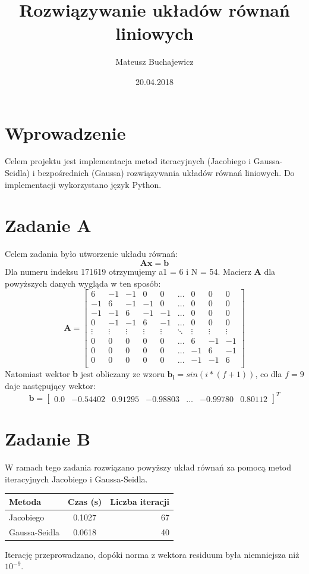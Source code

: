 \documentclass{article} %
\title{Rozwiązywanie układów równań liniowych}
\date{20.04.2018}
\author{Mateusz Buchajewicz}
\begin{document}
\maketitle

\section{Wprowadzenie}
Celem projektu jest implementacja metod iteracyjnych (Jacobiego i Gaussa-Seidla) i
bezpośrednich (Gaussa) rozwiązywania układów równań liniowych. Do implementacji wykorzystano język Python.

\section{Zadanie A}
Celem zadania było utworzenie układu równań:
\begin{equation}
\mathbf{Ax} = \mathbf{b}
\end{equation} 
Dla numeru indeksu 171619 otrzymujemy a1 = 6 i N = 54. \newline
Macierz \textbf{A} dla powyższych danych wygląda w ten sposób: \newline
\[
\textbf{A} = 
\begin{bmatrix}
    6 & -1 & -1 & 0 & 0 &\dots & 0 & 0 & 0 \\
    -1 & 6 & -1 & -1 & 0 & \dots & 0 & 0 & 0\\
    -1 & -1 & 6 & -1 & -1 & \dots & 0 & 0 & 0 \\
    0 & -1 & -1 & 6 & -1 & \dots & 0 & 0 & 0 \\
    \vdots & \vdots & \vdots & \vdots & \vdots & \ddots & \vdots & \vdots & \vdots \\
    0 & 0 & 0 & 0 & 0 & \dots & 6 & -1 & -1 \\
    0 & 0 & 0 & 0 & 0 & \dots & -1 & 6 & -1 \\
    0 & 0 & 0 & 0 & 0 & \dots & -1 & -1 & 6 \\
\end{bmatrix}
\]
Natomiast wektor \textbf{b} jest obliczany ze wzoru \( \mathbf{b_{i}} = sin(i*(f+1))\), co dla \(f = 9\) daje następujący wektor:
\[
    \textbf{b} = 
\begin{bmatrix}
    0.0 & -0.54402 & 0.91295 & -0.98803 & \dots & -0.99780 & 0.80112
\end{bmatrix}^T
\]
\section{Zadanie B}
W ramach tego zadania rozwiązano powyższy układ równań za pomocą metod iteracyjnych Jacobiego i Gaussa-Seidla. \\
\begin{center} 
    \begin{tabular}  { | l | c | r |   }
        \hline
        Metoda & Czas (s) & Liczba iteracji  \\
        \hline
        Jacobiego & 0.1027 & 67 \\
        \hline
        Gaussa-Seidla & 0.0618 & 40 \\
        \hline
    \end{tabular}
\end{center}
Iterację przeprowadzano, dopóki norma z wektora residuum była niemniejsza niż \(10^{-9}\).
\newpage
\end{document}
